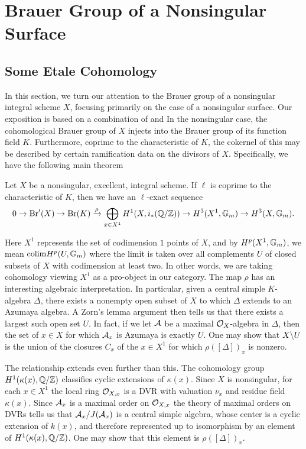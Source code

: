 \section{Brauer Group of a Nonsingular Surface}
\subsection{Some Etale Cohomology}
In this section, we turn our attention to the Brauer group of a nonsingular integral scheme $X$, focusing primarily on the case of a nonsingular surface.  Our exposition is based on a combination of \cite{artin1972some} and \cite{Artin&deJong} In the nonsingular case, the cohomological Brauer group of $X$ injects into the Brauer group of its function field $K$.  Furthermore, coprime to the characteristic of $K$, the cokernel of this may be described by certain ramification data on the divisors of $X$.  Specifically, we have the following main theorem
\begin{thm}
Let $X$ be a nonsingular, excellent, integral scheme.  If $\ell$ is coprime to the characteristic of $K$, then we have an $\ell$-exact sequence
$$0\rightarrow \textnormal{Br}'(X)\rightarrow\textnormal{Br}(K)\xrightarrow{\rho} \bigoplus_{x\in X^1} H^1(X,i_*(\mathbb{Q}/\mathbb{Z}))\rightarrow H^3(X^1,\mathbb{G}_m)\rightarrow H^3(X,\mathbb{G}_m).$$
\end{thm}
Here $X^1$ represents the set of codimension $1$ points of $X$, and by $H^p(X^1,\mathbb{G}_m)$, we mean $\textnormal{colim} H^p(U,\mathbb{G}_m)$ where the limit is taken over all complements $U$ of closed subsets of $X$ with codimension at least two.  In other words, we are taking cohomology viewing $X^1$ as a pro-object in our category.  The map $\rho$ has an interesting algebraic interpretation.  In particular, given a central simple $K$-algebra $\Delta$, there exists a nonempty open subset of $X$ to which $\Delta$ extends to an Azumaya algebra.  A Zorn's lemma argument then tells us that there exists a largest such open set $U$.  In fact, if we let $\mathcal{A}$ be a maximal $\mathcal{O}_X$-algebra in $\Delta$, then the set of $x\in X$ for which $\mathcal{A}_x$ is Azumaya is exactly $U$.  One may show that $X\backslash U$ is the union of the closures $C_x$ of the $x\in X^1$ for which $\rho([\Delta])_x$ is nonzero.

The relationship extends even further than this.  The cohomology group $H^1(\kappa(x),\mathbb{Q}/\mathbb{Z})$ classifies cyclic extensions of $\kappa(x)$.  Since $X$ is nonsingular, for each $x\in X^1$ the local ring $\mathcal{O}_{X,x}$ is a DVR with valuation $\nu_x$ and residue field $\kappa(x)$.  Since $\mathcal{A}_x$ is a maximal order on $\mathcal{O}_{X,x}$ the theory of maximal orders on DVRs tells us that $\mathcal{A}_x/J(\mathcal{A}_x)$ is a central simple algebra, whose center is a cyclic extension of $k(x)$, and therefore represented up to isomorphism by an element of $H^1(\kappa(x),\mathbb{Q}/\mathbb{Z})$.  One may show that this element is $\rho([\Delta])_x$.

